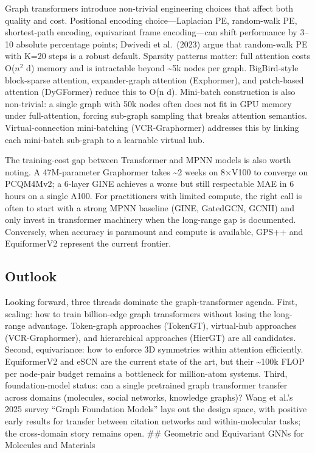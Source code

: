Graph transformers introduce non-trivial engineering choices that affect both quality and cost. Positional encoding choice---Laplacian PE, random-walk PE, shortest-path encoding, equivariant frame encoding---can shift performance by 3--10 absolute percentage points; Dwivedi et al.~(2023) argue that random-walk PE with K=20 steps is a robust default. Sparsity patterns matter: full attention costs O(\(n^2\) d) memory and is intractable beyond \textasciitilde5k nodes per graph. BigBird-style block-sparse attention, expander-graph attention (Exphormer), and patch-based attention (DyGFormer) reduce this to O(n d). Mini-batch construction is also non-trivial: a single graph with 50k nodes often does not fit in GPU memory under full-attention, forcing sub-graph sampling that breaks attention semantics. Virtual-connection mini-batching (VCR-Graphormer) addresses this by linking each mini-batch sub-graph to a learnable virtual hub.

The training-cost gap between Transformer and MPNN models is also worth noting. A 47M-parameter Graphormer takes \textasciitilde2 weeks on 8×V100 to converge on PCQM4Mv2; a 6-layer GINE achieves a worse but still respectable MAE in 6 hours on a single A100. For practitioners with limited compute, the right call is often to start with a strong MPNN baseline (GINE, GatedGCN, GCNII) and only invest in transformer machinery when the long-range gap is documented. Conversely, when accuracy is paramount and compute is available, GPS++ and EquiformerV2 represent the current frontier.

\subsection{Outlook}\label{outlook}

Looking forward, three threads dominate the graph-transformer agenda. First, scaling: how to train billion-edge graph transformers without losing the long-range advantage. Token-graph approaches (TokenGT), virtual-hub approaches (VCR-Graphormer), and hierarchical approaches (HierGT) are all candidates. Second, equivariance: how to enforce 3D symmetries within attention efficiently. EquiformerV2 and eSCN are the current state of the art, but their \textasciitilde100k FLOP per node-pair budget remains a bottleneck for million-atom systems. Third, foundation-model status: can a single pretrained graph transformer transfer across domains (molecules, social networks, knowledge graphs)? Wang et al.'s 2025 survey ``Graph Foundation Models'' lays out the design space, with positive early results for transfer between citation networks and within-molecular tasks; the cross-domain story remains open.
\#\# Geometric and Equivariant GNNs for Molecules and Materials

